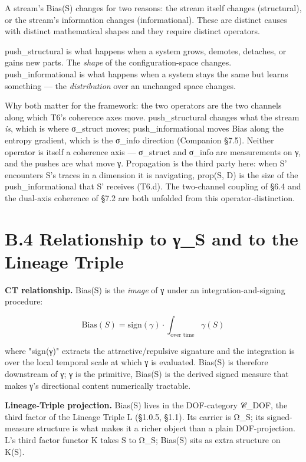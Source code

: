 \documentclass[11pt, openany]{book}
\newcommand{\sectionbreak}{\clearpage}
\begin{document}
A stream's Bias(S) changes for two reasons: the stream itself changes (structural), or the stream's information changes (informational). These are distinct causes with distinct mathematical shapes and they require distinct operators.

push\_\allowbreak{}structural is what happens when a system grows, demotes, detaches, or gains new parts. The \textit{shape} of the configuration-space changes. push\_\allowbreak{}informational is what happens when a system stays the same but learns something --- the \textit{distribution} over an unchanged space changes.

Why both matter for the framework: the two operators are the two channels along which T6's coherence axes move. push\_\allowbreak{}structural changes what the stream \textit{is}, which is where σ\_\allowbreak{}struct moves; push\_\allowbreak{}informational moves Bias along the entropy gradient, which is the σ\_\allowbreak{}info direction (Companion §7.5). Neither operator is itself a coherence axis --- σ\_\allowbreak{}struct and σ\_\allowbreak{}info are measurements on γ, and the pushes are what move γ. Propagation is the third party here: when S' encounters S's traces in a dimension it is navigating, prop(S, D) is the size of the push\_\allowbreak{}informational that S' receives (T6.d). The two-channel coupling of §6.4 and the dual-axis coherence of §7.2 are both unfolded from this operator-distinction.

\sectionbreak

\section{B.4 Relationship to γ\_\allowbreak{}S and to the Lineage Triple}

\textbf{CT relationship.} Bias(S) is the \textit{image} of γ under an integration-and-signing procedure:

$$\text{Bias}(S) = \text{sign}(\gamma) \cdot \int_{\text{over time}} \gamma(S)$$

where "sign(γ)" extracts the attractive/repulsive signature and the integration is over the local temporal scale at which γ is evaluated. Bias(S) is therefore downstream of γ; γ is the primitive, Bias(S) is the derived signed measure that makes γ's directional content numerically tractable.

\textbf{Lineage-Triple projection.} Bias(S) lives in the DOF-category 𝒞\_\allowbreak{}DOF, the third factor of the Lineage Triple L (§1.0.5, §1.1). Its carrier is Ω\_\allowbreak{}S; its signed-measure structure is what makes it a richer object than a plain DOF-projection. L's third factor functor Κ takes S to Ω\_\allowbreak{}S; Bias(S) sits as extra structure on Κ(S).
\end{document}
